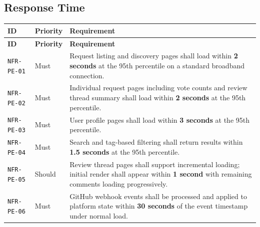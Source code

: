 \documentclass[12pt,a4paper]{article}
\begin{document}
\subsection{Response Time}
\begin{longtable}{L{2.2cm} L{1.8cm} L{9.3cm}}
  \color{white}\bfseries ID & \color{white}\bfseries Priority & \color{white}\bfseries Requirement \\
  \endfirsthead
  \color{white}\bfseries ID & \color{white}\bfseries Priority & \color{white}\bfseries Requirement \\
  \endhead\hline
  \texttt{NFR-PE-01} & Must   & Request listing and discovery pages shall load within \textbf{2 seconds} at the 95th percentile on a standard broadband connection. \\
  \texttt{NFR-PE-02} & Must   & Individual request pages including vote counts and review thread summary shall load within \textbf{2 seconds} at the 95th percentile. \\
  \texttt{NFR-PE-03} & Must   & User profile pages shall load within \textbf{3 seconds} at the 95th percentile. \\
  \texttt{NFR-PE-04} & Must   & Search and tag-based filtering shall return results within \textbf{1.5 seconds} at the 95th percentile. \\
  \texttt{NFR-PE-05} & Should & Review thread pages shall support incremental loading; initial render shall appear within \textbf{1 second} with remaining comments loading progressively. \\
  \texttt{NFR-PE-06} & Must   & GitHub webhook events shall be processed and applied to platform state within \textbf{30 seconds} of the event timestamp under normal load. \\
  \hline
\end{longtable}
\end{document}
